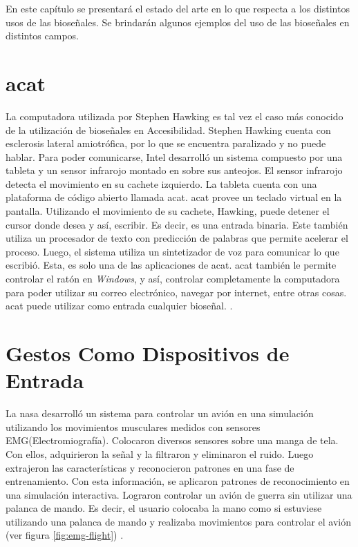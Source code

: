 En este capítulo se presentará el estado del arte en lo que respecta a los distintos usos de las bioseñales. Se brindarán algunos ejemplos del uso de las bioseñales en distintos campos.

\section{\acrshort{acat}}

La computadora utilizada por Stephen Hawking es tal vez el caso más conocido de la utilización de bioseñales en Accesibilidad. Stephen Hawking cuenta con esclerosis lateral amiotrófica, por lo que se encuentra paralizado y no puede hablar. Para poder comunicarse, Intel desarrolló un sistema compuesto por una tableta y un sensor infrarojo montado en sobre sus anteojos. El sensor infrarojo detecta el movimiento en su cachete izquierdo. La tableta cuenta con una plataforma de código abierto llamada \acrshort{acat}. \acrshort{acat} provee un teclado virtual en la pantalla. Utilizando el movimiento de su cachete, Hawking, puede detener el cursor donde desea y así, escribir. Es decir, es una entrada binaria. Este también utiliza un procesador de texto con predicción de palabras que permite acelerar el proceso.  Luego, el sistema utiliza un sintetizador de voz para comunicar lo que escribió. Esta, es solo una de las aplicaciones de \acrshort{acat}. \acrshort{acat} también le permite controlar el ratón en \emph{Windows}, y así, controlar completamente la computadora para poder utilizar su correo electrónico, navegar por internet, entre otras cosas. \acrshort{acat} puede utilizar como entrada cualquier bioseñal. \cite{hawking}.

\section{Gestos Como Dispositivos de Entrada}

La \acrshort{nasa} desarrolló un sistema para controlar un avión en una simulación utilizando los movimientos musculares medidos con sensores EMG(Electromiografía). Colocaron diversos sensores sobre una manga de tela. Con ellos, adquirieron la señal y la filtraron y eliminaron el ruido. Luego extrajeron las características y reconocieron patrones en una fase de entrenamiento. Con esta información, se aplicaron patrones de reconocimiento en una simulación interactiva. Lograron controlar un avión de guerra sin utilizar una palanca de mando. Es decir, el usuario colocaba la mano como si estuviese utilizando una palanca de mando y realizaba movimientos para controlar el avión (ver figura \ref{fig:emg-flight}) \cite{emg-flight}.

